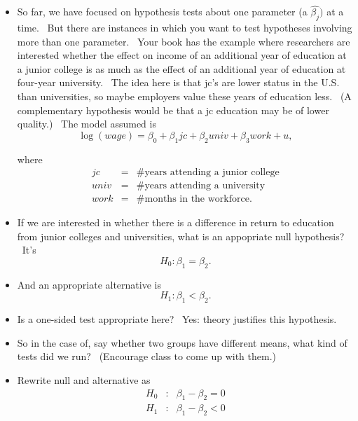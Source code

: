 \documentclass[11pt]{article}
\begin{document}
\begin{itemize}
\item So far, we have focused on hypothesis tests about one parameter (a $%
\widehat{\beta _{j}})$ at a time. \ But there are instances in which you
want to test hypotheses involving more than one parameter. \ Your book has
the example where researchers are interested whether the effect on income of
an additional year of education at a junior college is as much as the effect
of an additional year of education at four-year university. \ The idea here
is that jc's are lower status in the U.S. than universities, so maybe
employers value these years of education less. \ (A complementary hypothesis
would be that a jc education may be of lower quality.) \ The model assumed is%
\begin{equation*}
\log (wage)=\beta _{0}+\beta _{1}jc+\beta _{2}univ+\beta _{3}work+u,
\end{equation*}

where%
\begin{eqnarray*}
jc &=&\text{\# years attending a junior college} \\
univ &=&\text{\# years attending a university} \\
work &=&\text{\# months in the workforce.}
\end{eqnarray*}

\item If we are interested in whether there is a difference in return to
education from junior colleges and universities, what is an appopriate null
hypothesis? \ It's%
\begin{equation*}
H_{0}:\beta _{1}=\beta _{2}.
\end{equation*}

\item And an appropriate alternative is%
\begin{equation*}
H_{1}:\beta _{1}<\beta _{2}.
\end{equation*}

\item Is a one-sided test appropriate here? \ Yes: theory justifies this
hypothesis.

\item So in the case of, say whether two groups have different means, what
kind of tests did we run? \ (Encourage class to come up with them.)

\item Rewrite null and alternative as%
\begin{eqnarray*}
H_{0} &:&\beta _{1}-\beta _{2}=0 \\
H_{1} &:&\beta _{1}-\beta _{2}<0
\end{eqnarray*}


\end{itemize}
\end{document}
